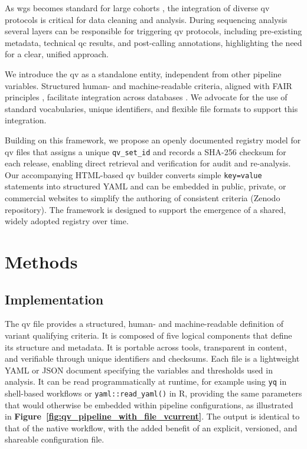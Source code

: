 \documentclass[unnumsec,webpdf,contemporary,large,namedate]{oup-authoring-template}
\begin{document}
As \ac{wgs} becomes standard for large cohorts \citep{lee2018gene, jansen2019genome}, the integration of diverse \ac{qv} protocols is critical for data cleaning and analysis. 
During sequencing analysis several layers can be responsible for triggering \ac{qv} protocols, including
pre-existing metadata, technical \ac{qc} results, and post-calling annotations,
highlighting the need for a clear, unified approach. 

We introduce the \ac{qv} as a standalone entity, independent from other pipeline variables. Structured human- and machine-readable criteria, aligned with FAIR principles \citep{wilkinson2016fair}, facilitate integration across databases \citep{van2023bridging, toure2023fairification}. We advocate for the use of standard vocabularies, unique identifiers, and flexible file formats to support this integration.

Building on this framework, we propose an openly documented registry model for \ac{qv} files that assigns a unique \texttt{qv\_set\_id} and records a SHA-256 checksum for each release, enabling direct retrieval and verification for audit and re-analysis. Our accompanying HTML-based \ac{qv} builder converts simple \texttt{key=value} statements into structured YAML and can be embedded in public, private, or commercial websites to simplify the authoring of consistent criteria (Zenodo repository). The framework is designed to support the emergence of a shared, widely adopted registry over time.

\section{Methods}
\subsection{Implementation} \label{sec:framework}
The \ac{qv} file provides a structured, human- and machine-readable definition of variant qualifying criteria.
It is composed of five logical components that define its structure and metadata.
It is portable across tools, transparent in content, and verifiable through unique identifiers and checksums.
Each file is a lightweight YAML or JSON document specifying the variables and thresholds used in analysis. 
It can be read programmatically at runtime, for example using \texttt{yq} in shell-based workflows or \texttt{yaml::read\_yaml()} in R, providing the same parameters that would otherwise be embedded within pipeline configurations, as illustrated in \textbf{Figure~\ref{fig:qv_pipeline_with_file_vcurrent}}.
The output is identical to that of the native workflow, with the added benefit of an explicit, versioned, and shareable configuration file.
\end{document}
